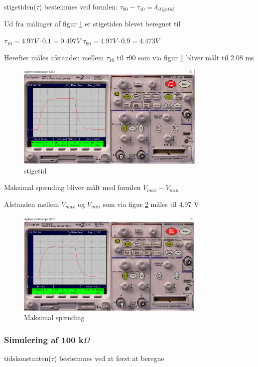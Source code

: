 stigetiden($\tau$) bestemmes ved formlen:
$\tau_{90} - \tau_{10} = \delta_{stigetid}$

Ud fra målinger af figur \ref{10k.50Hz.stigetid}
er stigetiden blevet beregnet til

$\tau_{10} = 4.97 V \cdot 0.1 = 0.497 V$
$\tau_{90} = 4.97 V \cdot 0.9 = 4.473 V$

Herefter måles afstanden mellem $\tau_{10}$ til $\tau{90}$ som via figur \ref{10k.50Hz.stigetid} bliver målt til 2.08 ms

\begin{figure}[h]
 \begin{center}
  \includegraphics[height=5cm]{P_Fig/figur4.10k.50Hz.stigetid}
  \caption{stigetid}
  \label{10k.50Hz.stigetid}
 \end{center}
\end{figure}

Maksimal spænding bliver målt med formlen
$V_{max} - V_{min}$

Afstanden mellem $V_{max}$ og $V_{min}$ som via figur \ref{10k.50Hz.min.max} måles til 4.97 V

\begin{figure}[h]
 \begin{center}
  \includegraphics[height=5cm]{P_Fig/figur2.10k.50Hz.min.max}
  \caption{Maksimal spænding}
  \label{10k.50Hz.min.max}
 \end{center}
\end{figure}


\subsubsection{Simulering af 100 k$\Omega$ }
tidskonstanten($\tau$) bestemmes ved at først at beregne 

